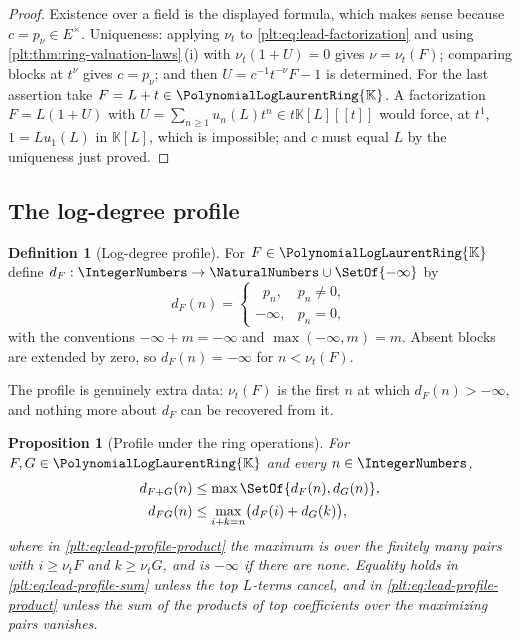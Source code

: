 \documentclass[11pt,oneside]{article}
\theoremstyle{plain}
\newtheorem{proposition}[theorem]{Proposition}
\theoremstyle{definition}
\newtheorem{definition}[theorem]{Definition}
\theoremstyle{remark}
\newcommand{\K}{\mathbb{K}}
\newcommand{\PLlau}{\PolynomialLogLaurentRing{\K}}       %
\newcommand{\ordt}{\nu_{t}}                              %
\DeclareMathOperator{\degL}{deg_{L}}
\newcommand{\dprofile}[1]{d_{#1}}                        %
\begin{document}
\begin{proof}
Existence over a field is the displayed formula, which makes sense because
\(c=p_\nu\in E^\times\).  Uniqueness: applying \(\ordt\) to
\eqref{plt:eq:lead-factorization} and using
\cref{plt:thm:ring-valuation-laws}\,(i) with \(\ordt(1+U)=0\) gives
\(\nu=\ordt(F)\); comparing blocks at \(t^\nu\) gives \(c=p_\nu\); and then
\(U=c^{-1}t^{-\nu}F-1\) is determined.  For the last assertion take
\(F=L+t\in\PLlau\).  A factorization \(F=L(1+U)\) with
\(U=\sum_{n\ge1}u_n(L)t^n\in t\K[L][[t]]\) would force, at \(t^1\),
\(1=Lu_1(L)\) in \(\K[L]\), which is impossible; and \(c\) must equal \(L\) by
the uniqueness just proved.
\end{proof}

\subsection{The log-degree profile}
\label{plt:sec:lead-profile}

\begin{definition}[Log-degree profile]
\label{plt:def:lead-profile}
For \(F\in\PLlau\) define \(\dprofile{F}:\IntegerNumbers\to
\NaturalNumbers\cup\SetOf{-\infty}\) by
\begin{equation}\label{plt:eq:lead-profile}
  \dprofile{F}(n)=
  \begin{cases}
    \degL p_n,&p_n\ne0,\\
    -\infty,&p_n=0,
  \end{cases}
\end{equation}
with the conventions \(-\infty+m=-\infty\) and \(\max(-\infty,m)=m\).  Absent
blocks are extended by zero, so \(\dprofile{F}(n)=-\infty\) for
\(n<\ordt(F)\).
\end{definition}

The profile is genuinely extra data: \(\ordt(F)\) is the first \(n\) at which
\(\dprofile{F}(n)>-\infty\), and nothing more about \(\dprofile{F}\) can be
recovered from it.

\begin{proposition}[Profile under the ring operations]
\label{plt:prop:lead-profile-laws}
For \(F,G\in\PLlau\) and every \(n\in\IntegerNumbers\),
\begin{align}
  \dprofile{F+G}(n)&\le\max\SetOf{\dprofile{F}(n),\dprofile{G}(n)},
    \label{plt:eq:lead-profile-sum}\\
  \dprofile{FG}(n)&\le
    \max_{i+k=n}\bigl(\dprofile{F}(i)+\dprofile{G}(k)\bigr),
    \label{plt:eq:lead-profile-product}
\end{align}
where in \eqref{plt:eq:lead-profile-product} the maximum is over the finitely
many pairs with \(i\ge\ordt F\) and \(k\ge\ordt G\), and is \(-\infty\) if
there are none.  Equality holds in \eqref{plt:eq:lead-profile-sum} unless the
top \(L\)-terms cancel, and in \eqref{plt:eq:lead-profile-product} unless the
sum of the products of top coefficients over the maximizing pairs vanishes.
\end{proposition}
\end{document}
